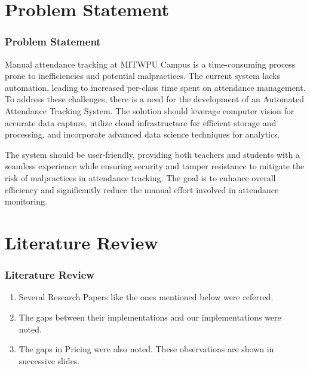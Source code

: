 \documentclass[aspectratio=169]{beamer}
\begin{document}
\section{Problem Statement}
\begin{frame}
	\frametitle{Problem Statement}
  \begin{minipage}{0.95\textwidth}

  Manual attendance tracking at MITWPU Campus is a time-consuming process prone to inefficiencies and potential malpractices. The current system lacks automation, leading to increased per-class time spent on attendance management.
	\vspace*{0.5cm}
	To address these challenges, there is a need for the development of an Automated Attendance Tracking System. The solution should leverage computer vision for accurate data capture, utilize cloud infrastructure for efficient storage and processing, and incorporate advanced data science techniques for analytics.

	\vspace*{0.5cm}
	The system should be user-friendly, providing both teachers and students with a seamless experience while ensuring security and tamper resistance to mitigate the risk of malpractices in attendance tracking. The goal is to enhance overall efficiency and significantly reduce the manual effort involved in attendance monitoring.
  \end{minipage}
    
\end{frame}

\section{Literature Review}
\begin{frame}
	\frametitle{Literature Review}
	\begin{minipage}{0.95\textwidth}
  \begin{enumerate}
		\item Several Research Papers like the ones mentioned below were referred.
		\item The gaps between their implementations and our implementations were noted.
		\item The gaps in Pricing were also noted.
		      These observations are shown in successive slides.
        \end{enumerate}
      \end{minipage}
\end{frame}
\end{document}

